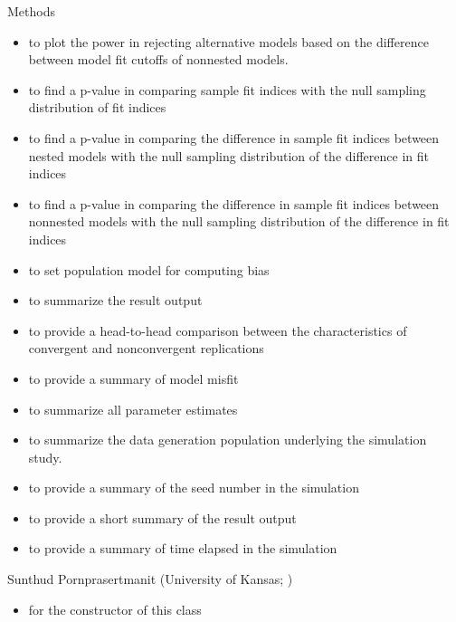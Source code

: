\documentclass[a4paper]{book}
\begin{document}
\begin{Section}{Methods}
\begin{itemize}
\item {} to plot the power in rejecting alternative models based on the difference between model fit cutoffs of nonnested models.   
\item {} to find a p-value in comparing sample fit indices with the null sampling distribution of fit indices
\item {} to find a p-value in comparing the difference in sample fit indices between nested models with the null sampling distribution of the difference in fit indices
\item {} to find a p-value in comparing the difference in sample fit indices between nonnested models with the null sampling distribution of the difference in fit indices
\item {} to set population model for computing bias
\item {} to summarize the result output
\item {} to provide a head-to-head comparison between the characteristics of convergent and nonconvergent replications
\item {} to provide a summary of model misfit
\item {} to summarize all parameter estimates
\item {} to summarize the data generation population underlying the simulation study.
\item {} to provide a summary of the seed number in the simulation
\item {} to provide a short summary of the result output
\item {} to provide a summary of time elapsed in the simulation

\end{itemize}

\end{Section}
%
\begin{Author}\relax
Sunthud Pornprasertmanit (University of Kansas; )
\end{Author}
%
\begin{SeeAlso}\relax
\begin{itemize}

\item {} for the constructor of this class

\end{itemize}

\end{SeeAlso}
\end{document}

